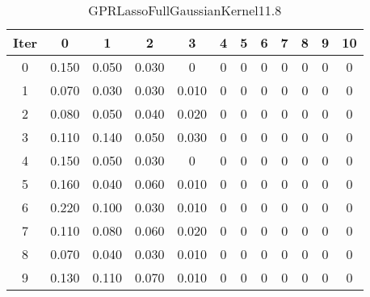 \begin{table}
	\begin{center}
		\begin{tabular}{|c|c|c|c|c|c|c|c|c|c|c|c|}
			\hline
			Iter & 0 & 1 & 2 & 3 & 4 & 5 & 6 & 7 & 8 & 9 & 10 \\
			\hline
			0 & 0.150 & 0.050 & 0.030 & 0 & 0 & 0 & 0 & 0 & 0 & 0 & 0 \\
			\hline
			1 & 0.070 & 0.030 & 0.030 & 0.010 & 0 & 0 & 0 & 0 & 0 & 0 & 0 \\
			\hline
			2 & 0.080 & 0.050 & 0.040 & 0.020 & 0 & 0 & 0 & 0 & 0 & 0 & 0 \\
			\hline
			3 & 0.110 & 0.140 & 0.050 & 0.030 & 0 & 0 & 0 & 0 & 0 & 0 & 0 \\
			\hline
			4 & 0.150 & 0.050 & 0.030 & 0 & 0 & 0 & 0 & 0 & 0 & 0 & 0 \\
			\hline
			5 & 0.160 & 0.040 & 0.060 & 0.010 & 0 & 0 & 0 & 0 & 0 & 0 & 0 \\
			\hline
			6 & 0.220 & 0.100 & 0.030 & 0.010 & 0 & 0 & 0 & 0 & 0 & 0 & 0 \\
			\hline
			7 & 0.110 & 0.080 & 0.060 & 0.020 & 0 & 0 & 0 & 0 & 0 & 0 & 0 \\
			\hline
			8 & 0.070 & 0.040 & 0.030 & 0.010 & 0 & 0 & 0 & 0 & 0 & 0 & 0 \\
			\hline
			9 & 0.130 & 0.110 & 0.070 & 0.010 & 0 & 0 & 0 & 0 & 0 & 0 & 0 \\
			\hline
		\end{tabular}
	\end{center}
	\caption{GPRLassoFullGaussianKernel11.8}
\end{table}